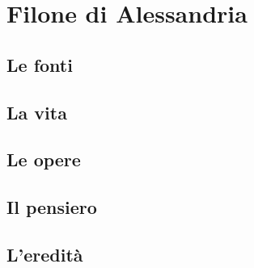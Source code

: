 \chapter{Filone di Alessandria}

\section{Le fonti}

\section{La vita}

\section{Le opere}

\section{Il pensiero}

\section{L'eredità}

